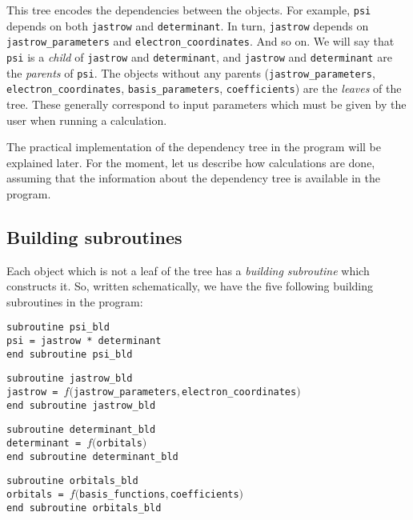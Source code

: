 \documentclass[a4paper,11pt]{article}
\begin{document}
This tree encodes the dependencies between the objects. For example, {\tt psi} depends on both {\tt jastrow} and {\tt determinant}. In turn, {\tt jastrow} depends on {\tt jastrow\_parameters} and {\tt electron\_coordinates}. And so on. We will say that {\tt psi} is a {\it child} of {\tt jastrow} and {\tt determinant}, and {\tt jastrow} and {\tt determinant} are the {\it parents} of  {\tt psi}. The objects without any parents ({\tt jastrow\_parameters}, {\tt electron\_coordinates}, {\tt basis\_parameters}, {\tt coefficients}) are the {\it leaves} of the tree. These generally correspond to input parameters which must be given by the user when running a calculation.

The practical implementation of the dependency tree in the program will be explained later. For the moment, let us describe how calculations are done, assuming that the information about the dependency tree is available in the program.

\subsection{Building subroutines}

Each object which is not a leaf of the tree has a {\it building subroutine} which constructs it. So, written schematically, we have the five following building subroutines in the program:

\vspace{0.5cm}
\noindent
{\tt subroutine psi\_bld\\
psi = jastrow * determinant\\
end subroutine psi\_bld}

\vspace{0.5cm}
\noindent
{\tt subroutine jastrow\_bld\\
jastrow  = $f(${\tt jastrow\_parameters}$,${\tt electron\_coordinates}$)$\\
end subroutine jastrow\_bld}

\vspace{0.5cm}
\noindent
{\tt subroutine determinant\_bld\\
determinant  = $f(${\tt orbitals}$)$\\
end subroutine determinant\_bld}

\vspace{0.5cm}
\noindent
{\tt subroutine orbitals\_bld\\
orbitals  = $f(${\tt basis\_functions}$,${\tt coefficients}$)$\\
end subroutine orbitals\_bld}
\end{document}
